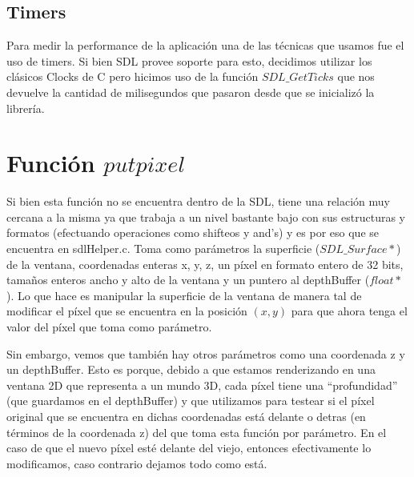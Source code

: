 \documentclass[a4paper]{article}
\begin{document}
\subsection{Timers}
Para medir la performance de la aplicación una de las técnicas que usamos fue el uso de timers. Si bien SDL provee soporte para esto, decidimos utilizar los clásicos Clocks de C pero hicimos uso de la función $SDL\_GetTicks$ que nos devuelve la cantidad de milisegundos que pasaron desde que se inicializó la librería.

\section{Función $putpixel$}
Si bien esta función no se encuentra dentro de la SDL, tiene una relación muy cercana a la misma ya que trabaja a un nivel bastante bajo con sus estructuras y formatos (efectuando operaciones como shifteos y and's) y es por eso que se encuentra en sdlHelper.c.
Toma como parámetros la superficie ($SDL\_Surface*$) de la ventana, coordenadas enteras x, y, z, un píxel en formato entero de 32 bits, tamaños enteros ancho y alto de la ventana y un puntero al depthBuffer ($float*$). Lo que hace es manipular la superficie de la ventana de manera tal de modificar el píxel que se encuentra en la posición $(x, y)$ para que ahora tenga el valor del píxel que toma como parámetro. 
\par Sin embargo, vemos que también hay otros parámetros como una coordenada z y un depthBuffer. Esto es porque, debido a que estamos renderizando en una ventana 2D que representa a un mundo 3D, cada píxel tiene una ``profundidad'' (que guardamos en el depthBuffer) y que utilizamos para testear si el píxel original que se encuentra en dichas coordenadas está delante o detras (en términos de la coordenada z) del que toma esta función por parámetro.
En el caso de que el nuevo píxel esté delante del viejo, entonces efectivamente lo modificamos, caso contrario dejamos todo como está.
\end{document}
